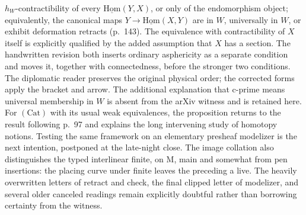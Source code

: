 \documentclass[10pt,oneside]{book}
\begin{document}
$h_W$-contractibility of every $\underline{\mathrm{Hom}}(Y,X)$, or only of the endomorphism object; equivalently, the canonical maps $Y\to\underline{\mathrm{Hom}}(X,Y)$ are in $W$, universally in $W$, or exhibit deformation retracts (p.~143). The equivalence with contractibility of $X$ itself is explicitly qualified by the added assumption that $X$ has a section. The handwritten revision both inserts ordinary asphericity as a separate condition and moves it, together with connectedness, before the stronger two conditions. The diplomatic reader preserves the original physical order; the corrected forms apply the bracket and arrow. The additional explanation that c-prime means universal membership in $W$ is absent from the arXiv witness and is retained here. For $(\mathrm{Cat})$ with its usual weak equivalences, the proposition returns to the result following p.~97 and explains the long intervening study of homotopy notions. Testing the same framework on an elementary presheaf modelizer is the next intention, postponed at the late-night close. The image collation also distinguishes the typed interlinear finite, on M, main and somewhat from pen insertions: the placing curve under finite leaves the preceding a live. The heavily overwritten letters of retract and check, the final clipped letter of modelizer, and several older canceled readings remain explicitly doubtful rather than borrowing certainty from the witness.
\end{document}
